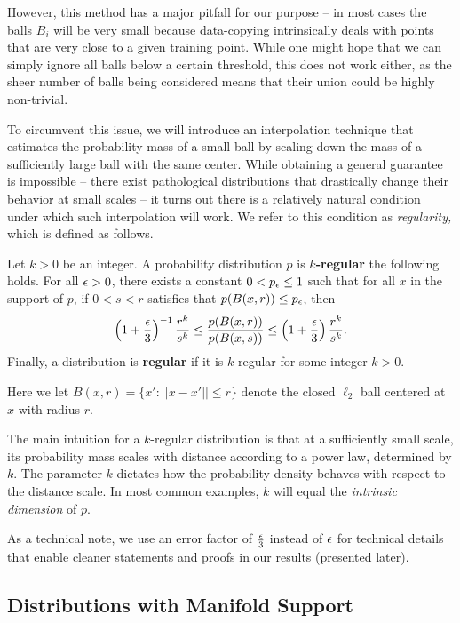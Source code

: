 However, this method has a major pitfall for our purpose -- in most cases the balls $B_i$ will be very small because data-copying intrinsically deals with points that are very close to a given training point. While one might hope that we can simply ignore all balls below a certain threshold, this does not work either, as the sheer number of balls being considered means that their union could be highly non-trivial. 

To circumvent this issue, we will introduce an interpolation technique that estimates the probability mass of a small ball by scaling down the mass of a sufficiently large ball with the same center. While obtaining a general guarantee is impossible -- there exist pathological  distributions that drastically change their behavior at small scales -- it turns out there is a relatively natural condition under which such interpolation will work. We refer to this condition as \textit{regularity,} which is defined as follows.

\begin{definition}\label{def:regular}
Let $k> 0$ be an integer. A probability distribution $p$ is \textbf{$k$-regular} the following holds. For all $\epsilon > 0$, there exists a constant $0 < p_\epsilon \leq 1$ such that for all $x$ in the support of $p$, if $0 < s < r$ satisfies that $p(B(x, r)) \leq p_\epsilon$, then $$\left(1+\frac{\epsilon}{3}\right)^{-1}\frac{r^k}{s^{k}} \leq \frac{p(B(x, r))}{p(B(x, s))} \leq \left(1+\frac{\epsilon}{3}\right)\frac{r^k}{s^{k}}.$$ Finally, a distribution is \textbf{regular} if it is $k$-regular for some integer $k > 0$. 
\end{definition}

Here we let $B(x, r) = \{x': ||x - x'|| \leq r\}$ denote the closed $\ell_2$ ball centered at $x$ with radius $r$. 

The main intuition for a $k$-regular distribution is that at a sufficiently small scale, its probability mass scales with distance according to a power law, determined by $k$. The parameter $k$ dictates how the probability density behaves with respect to the distance scale. In most common examples, $k$ will equal the \textit{intrinsic dimension}  of $p$.

As a technical note, we use an error factor of $\frac{\epsilon}{3}$ instead of $\epsilon$ for technical details that enable cleaner statements and proofs in our results (presented later). 

\subsection{Distributions with Manifold Support}

